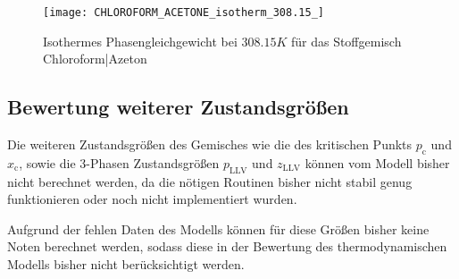 \documentclass[../thesis.tex]{subfiles}
\begin{document}
\begin{figure}[hbt]
	\centering
	\texttt{[image: CHLOROFORM\_ACETONE\_isotherm\_308.15\_]}
	\caption{Isothermes Phasengleichgewicht bei $ 308.15 K$ für das Stoffgemisch Chloroform|Azeton}
	\label{fig: druckminimumazeotrop}
\end{figure}

\subsection{Bewertung weiterer Zustandsgrößen}

Die weiteren Zustandsgrößen des Gemisches wie die des kritischen Punkts $ p_{\mathrm{c}}$ und $ x_{\mathrm{c}}$, sowie die 3-Phasen Zustandsgrößen $p_{\mathrm{LLV}}$ und $z_{\mathrm{LLV}}$ können vom Modell bisher nicht berechnet werden, da die nötigen Routinen bisher nicht stabil genug funktionieren oder noch nicht implementiert wurden.

Aufgrund der fehlen Daten des Modells können für diese Größen bisher keine Noten berechnet werden, sodass diese in der Bewertung des thermodynamischen Modells bisher nicht berücksichtigt werden.
\end{document}
